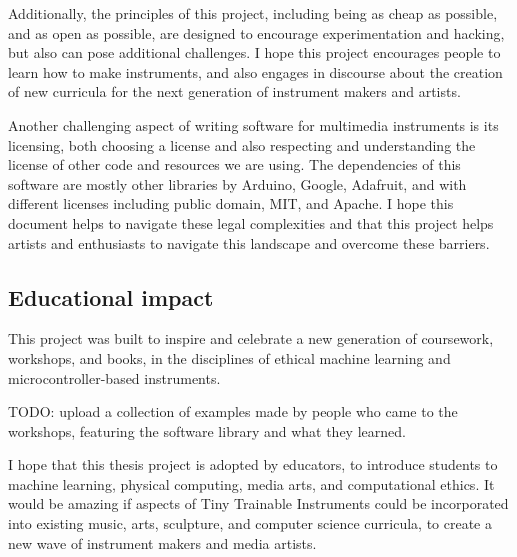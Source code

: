 Additionally, the principles of this project, including being as cheap as possible, and as open as possible, are designed to encourage experimentation and hacking, but also can pose additional challenges. I hope this project encourages people to learn how to make instruments, and also engages in discourse about the creation of new curricula for the next generation of instrument makers and artists.

Another challenging aspect of writing software for multimedia instruments is its licensing, both choosing a license and also respecting and understanding the license of other code and resources we are using. The dependencies of this software are mostly other libraries by Arduino, Google, Adafruit, and with different licenses including public domain, MIT, and Apache. I hope this document helps to navigate these legal complexities and that this project helps artists and enthusiasts to navigate this landscape and overcome these barriers.

\subsection{Educational impact}

This project was built to inspire and celebrate a new generation of coursework, workshops, and books, in the disciplines of ethical machine learning and microcontroller-based instruments.

TODO: upload a collection of examples made by people who came to the workshops, featuring the software library and what they learned.

I hope that this thesis project is adopted by educators, to introduce students to machine learning, physical computing, media arts, and computational ethics. It would be amazing if aspects of Tiny Trainable Instruments could be incorporated into existing music, arts, sculpture, and computer science curricula, to create a new wave of instrument makers and media artists.
